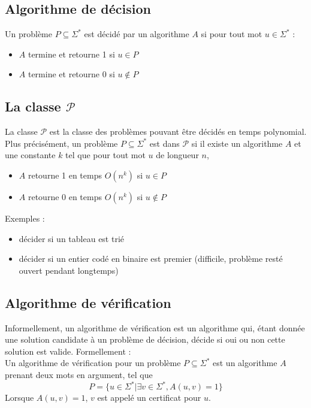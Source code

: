 \documentclass[a4paper]{article}
\begin{document}
  \subsection{Algorithme de décision}
  Un problème $P \subseteq \Sigma^*$ est décidé par un algorithme $A$ si 
pour 
  tout mot $u \in \Sigma^*$ : 
  \begin{itemize}
    \item $A$ termine et retourne 1 si $u \in P$
    \item $A$ termine et retourne 0 si $u \not \in P$
  \end{itemize}

  \subsection{La classe $\mathcal{P}$}
  La classe $\mathcal{P}$ est la classe des problèmes pouvant être 
décidés en temps
  polynomial. Plus précisément, un problème $P \subseteq \Sigma^*$ est 
dans $\mathcal{P}$
  si il existe un algorithme $A$ et une constante $k$ tel que pour tout 
mot $u$
  de longueur $n$, 
  \begin{itemize}
    \item $A$ retourne 1 en temps $O(n^k)$ si $u \in P$
    \item $A$ retourne 0 en temps $O(n^k)$ si $u \not \in P$
  \end{itemize}

  Exemples :
  \begin{itemize}
    \item décider si un tableau est trié
    \item décider si un entier codé en binaire est premier (difficile, 
problème
    resté ouvert pendant longtemps)
  \end{itemize}

  \subsection{Algorithme de vérification}
  Informellement, un algorithme de vérification est un algorithme qui, 
étant donnée
  une solution candidate à un problème de décision, décide si oui ou non 
cette
  solution est valide. Formellement : \\

  Un algorithme de vérification pour un problème $P \subseteq \Sigma^*$ 
est un
  algorithme $A$ prenant deux mots en argument, tel que 
  $$ P = \{ u \in \Sigma^* | \exists v \in \Sigma^*, A(u,v) =1 \} $$
  Lorsque $A(u,v) = 1$, $v$ est appelé un certificat pour $u$.
\end{document}
